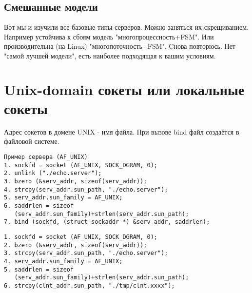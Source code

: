 \subsection{Смешанные модели}

Вот мы и изучили все базовые типы серверов. Можно заняться их скрещиванием.
Например устойчива к сбоям модель "многопроцессность+FSM". Или производительна (на Linux) "многопоточность+FSM".
Cнова повторюсь. Нет "самой лучшей модели", есть наиболее подходящая к вашим условиям.

\section{Unix-domain сокеты или локальные сокеты}

Адрес сокетов в домене UNIX - имя файла. При вызове bind файл создаётся в файловой системе.
\begin{verbatim}
Пример сервера (AF_UNIX)
1. sockfd = socket (AF_UNIX, SOCK_DGRAM, 0);
2. unlink ("./echo.server");
3. bzero (&serv_addr, sizeof(serv_addr));
4. strcpy(serv_addr.sun_path, "./echo.server");
5. serv_addr.sun_family = AF_UNIX;
6. saddrlen = sizeof
   (serv_addr.sun_family)+strlen(serv_addr.sun_path);
7. bind (sockfd, (struct sockaddr *) &serv_addr, saddrlen);
\end{verbatim}

\begin{verbatim}
1. sockfd = socket (AF_UNIX, SOCK_DGRAM, 0);
2. bzero (&serv_addr, sizeof(serv_addr));
3. strcpy(serv_addr.sun_path, "./echo.server");
4. serv_addr.sun_family = AF_UNIX;
5. saddrlen = sizeof
   (serv_addr.sun_family)+strlen(serv_addr.sun_path);
6. strcpy(clnt_addr.sun_path, "./tmp/clnt.xxxx");
\end{verbatim}
